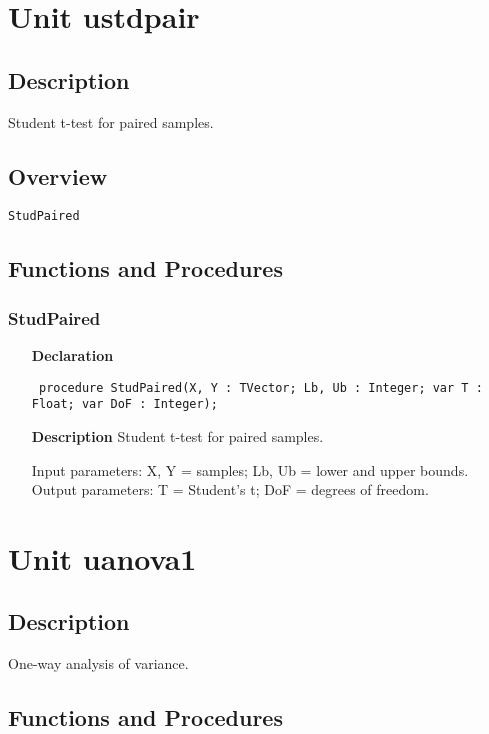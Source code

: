 \documentclass[12pt,a4paper,oneside]{report}
\newcommand{\declarationitem}[1]{\textbf{#1}}
\newcommand{\descriptiontitle}[1]{\textbf{#1}}
\newcommand{\code}[1]{\texttt{#1}}
\begin{document}
\section{Unit ustdpair}
\label{ustdpair}
\subsection{Description}
Student t{-}test for paired samples. 
\subsection{Overview}
\begin{description}
	\item[\texttt{StudPaired}]
\end{description}
\subsection{Functions and Procedures}
\subsubsection{StudPaired}
\label{ustdpair-StudPaired}
\begin{itemize}\item[\declarationitem{Declaration}\hfill]
	\begin{flushleft}
		\code{
			procedure StudPaired(X, Y : TVector; Lb, Ub : Integer; var T : Float; var DoF : Integer);}
	\end{flushleft}
	\item[\descriptiontitle{Description}]
	Student t{-}test for paired samples.
	
	Input parameters: X, Y = samples; Lb, Ub = lower and upper bounds. Output parameters: T = Student's t; DoF = degrees of freedom.
\end{itemize}

\section{Unit uanova1}
\label{uanova1}
\subsection{Description}
One{-}way analysis of variance. 
\subsection{Functions and Procedures}
\end{document}
